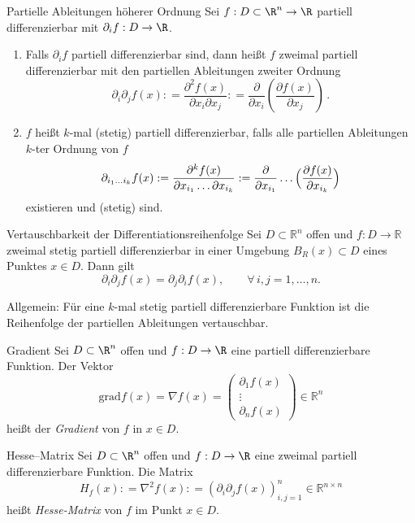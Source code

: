 \begin{definition}{Partielle Ableitungen höherer Ordnung}
    Sei $f : D \subset \R^n \to \R$ partiell differenzierbar mit $\partial_i f : D \to \R$.
    \begin{enumerate}
        \item Falls $\partial_i f$ partiell differenzierbar sind, dann heißt $f$ zweimal partiell differenzierbar mit den partiellen Ableitungen zweiter Ordnung
        $$
            \partial_i \partial_j f(x) : = \frac{\partial^2 f(x)}{\partial x_i \partial x_j} : = \frac{\partial}{\partial x_i}\left(\frac{\partial f(x)}{\partial x_j}\right) \, .
        $$
        \item $f$ heißt $k$-mal (stetig) partiell differenzierbar, falls alle partiellen Ableitungen $k$-ter Ordnung von $f$
        $$
            \partial_{i_1\dots i_k} f(x) : = \frac{\partial^k f(x)}{\partial x_{i_1}\dots\partial x_{i_k}} : = \frac{\partial}{\partial x_{i_1}} \dots \Bigl( \frac{\partial f(x)}{\partial x_{i_k}} \Bigr)
        $$
        existieren und (stetig) sind.
    \end{enumerate}
\end{definition}

\begin{satz}{Vertauschbarkeit der Differentiationsreihenfolge}
    Sei $D\subset\mathbb{R}^n$ offen und $f:D\to\mathbb{R}$ zweimal stetig partiell differenzierbar in einer Umgebung $B_R(x)\subset D$ eines Punktes $x\in D$. Dann gilt
    $$
    \partial_i\partial_j f(x)=\partial_j\partial_i f(x),\qquad \forall\, i,j=1,\dots,n.
    $$

    Allgemein: Für eine $k$-mal stetig partiell differenzierbare Funktion ist die Reihenfolge der partiellen Ableitungen vertauschbar.   
\end{satz}

\begin{definition}{Gradient}
    Sei $D \subset \R^n$ offen und $f : D \to \R$ eine partiell differenzierbare Funktion. Der Vektor
    $$
        \mathrm{grad} f(x) = \nabla f(x) = \begin{pmatrix} \partial_1 f(x) \\\vdots \\\partial_n f(x) \end{pmatrix} \in \mathbb{R}^n
    $$
    heißt der \emph{Gradient} von $f$ in $x \in D$.
\end{definition}

\begin{definition}{Hesse--Matrix}
    Sei $D \subset \R^n$ offen und $f : D \to \R$ eine zweimal partiell differenzierbare Funktion. Die Matrix
    $$
        H_f(x) : = \nabla^2 f(x) : = (\partial_i\partial_j f(x))_{i,j=1}^n \in \mathbb{R}^{n\times n}
    $$
    heißt \emph{Hesse-Matrix} von $f$ im Punkt $x \in D$.
\end{definition}

